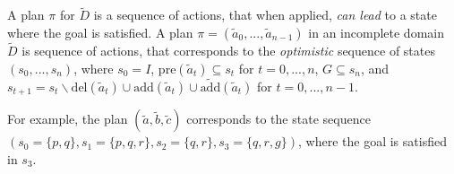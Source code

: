 \documentclass{article}
\newtheorem{theorem}{Theorem}[section]
\begin{document}
A plan $\pi$ for $\tilde{D}$ is a sequence of actions, that when applied, {\em can lead} to a state where the goal is satisfied.  A plan $\pi = (\tilde{a}_0, ..., \tilde{a}_{n-1})$ in an incomplete domain $\tilde{D}$ is sequence of actions, that corresponds to the {\em optimistic} sequence of states $(s_0, ..., s_n)$, where $s_0 = I$, $\text{pre}(\tilde{a}_t) \subseteq s_t$ for $t = 0,..., n$, $G \subseteq s_n$, and $s_{t+1} = s_t \backslash \text{del}(\tilde{a}_t) \cup \text{add}(\tilde{a}_t) \cup \widetilde{\text{add}}(\tilde{a}_t)$ for $t = 0,..., n-1$.  

For example, the plan $(\tilde{a}, \tilde{b}, \tilde{c})$ corresponds to the state sequence $(s_0 = \{p, q\}, s_1 = \{p, q, r\}, s_2 = \{q, r\}, s_3 = \{q, r, g\})$, where the goal is satisfied in $s_3$.  

%
%
%
\end{document}
